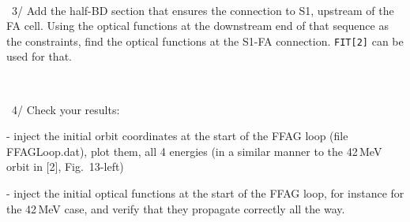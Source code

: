\documentclass[10pt]{article}
\newcommand{\nin}{\noindent~}
\begin{document}
~

\nin 3/ Add the half-BD section that ensures the connection to S1,
upstream of the FA cell. Using the optical functions at the downstream end of that sequence as
the constraints, find the optical functions at the S1-FA connection.  \texttt{FIT[2]} can be used for that. 

~

\nin 4/ Check your results:

- inject the initial orbit coordinates at the start of the FFAG loop (file FFAGLoop.dat),
plot them, all 4 energies (in a similar manner to the 42\,MeV orbit in [2], Fig.~13-left)

- inject the initial optical functions at the start of the FFAG loop, 
for instance for the 42\,MeV case, and verify that they propagate correctly all the way. 

 
\end{document}
